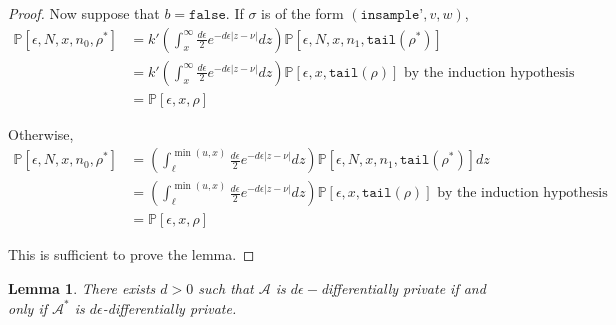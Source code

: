 \documentclass[12pt]{article}
\newcommand{\PP}{\mathbb{P}}
\newtheorem{lemma}[thm]{Lemma}
\theoremstyle{definition}
\begin{document}
\begin{proof}
	Now suppose that $b = \texttt{false}$. If $\sigma$ is of the form $(\texttt{insample'}, v, w)$, 
	\begin{align*}
		\PP[\epsilon, N, x, n_0, \rho^*] &= k'\left(\int_x^\infty\frac{d\epsilon}{2}e^{-d\epsilon|z-\nu|}dz\right)\PP[\epsilon, N, x, n_1, \texttt{tail}(\rho^*)]\\
		&= k'\left(\int_x^\infty\frac{d\epsilon}{2}e^{-d\epsilon|z-\nu|}dz\right)\PP[\epsilon, x, \texttt{tail}(\rho)] \text{ by the induction hypothesis }\\
		&= \PP[\epsilon, x, \rho]
	\end{align*}

	Otherwise, 
	\begin{align*}
		\PP[\epsilon, N, x, n_0, \rho^*] &= \left(\int_{\ell}^{\min(u, x)}\frac{d\epsilon}{2}e^{-d\epsilon|z-\nu|}dz\right)\PP[\epsilon, N, x, n_1, \texttt{tail}(\rho^*)]dz \\
		&= \left(\int_{\ell}^{\min(u, x)}\frac{d\epsilon}{2}e^{-d\epsilon|z-\nu|}dz\right)\PP[\epsilon, x, \texttt{tail}(\rho)] \text{ by the induction hypothesis }\\
		&= \PP[\epsilon, x, \rho]
	\end{align*}

	This is sufficient to prove the lemma. 
	
\end{proof}

\begin{lemma}\label{dpequiv}
	There exists $d > 0$ such that $\mathcal{A}$ is $d\epsilon-$differentially private if and only if $\mathcal{A}^*$ is $d\epsilon$-differentially private.
\end{lemma}
\end{document}
